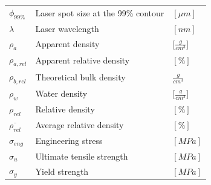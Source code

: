 \documentclass[
11pt, %
british, %
singlespacing, %
headsepline, %
]{MastersDoctoralThesis} %
\begin{document}
\begin{tabular}{lll}
$\phi_{99\%}$ & Laser spot size at the 99\% contour & $[\mu m]$\\
$\lambda$ & Laser wavelength & $[nm]$\\
$\rho_{a}$ & Apparent density & $[\frac{g}{cm^3}$] \\
$\rho_{a,rel}$ & Apparent relative density & $[\%]$ \\
$\rho_{b,rel}$ & Theoretical bulk density & $\frac{g}{cm^3}$\\ 
$\rho_{w}$ & Water density & $[\frac{g}{cm^3}$]\\
$\rho_{rel}$ & Relative density & $[\%]$ \\
$\overline{\rho_{rel}}$ & Average relative density & $[\%]$ \\
$\sigma_{eng}$ & Engineering stress & $[MPa]$\\
$\sigma_u$ & Ultimate tensile strength & $[MPa]$\\
$\sigma_y$ & Yield strength & $[MPa]$\\


\end{tabular}




\mainmatter %

\pagestyle{thesis} %









\end{document}
